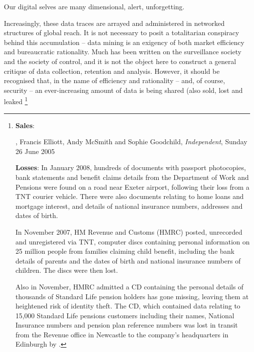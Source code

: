 {{

} Our digital
selves are many dimensional, alert, unforgetting.

Increasingly, these data traces are arrayed and administered in
networked structures of global reach. It is not necessary to posit a
totalitarian conspiracy behind this accumulation {--} data mining is an
exigency of both market efficiency and bureaucratic rationality. Much
has been written on the surveillance society and the society of
control, and it is not the object here to construct a general critique
of data collection, retention and analysis. However, it should be
recognised that, in the name of efficiency and rationality {--} and, of
course, security {--} an ever{}-increasing amount of data is being
shared (also sold, lost and leaked \footnote{{\bf Sales}: 

, Francis Elliott, Andy McSmith and Sophie Goodchild, {\em Independent}, Sunday 26 June 2005


{\bf Losses}: In January 2008, hundreds of documents with passport photocopies, bank
statements and benefit claims details from the Department of Work and
Pensions were found on a road near Exeter airport, following their loss
from a TNT courier vehicle. There were also documents relating to home
loans and mortgage interest, and details of national insurance numbers,
addresses and dates of birth.

In November 2007, HM Revenue and Customs (HMRC) posted, unrecorded and
unregistered via TNT, computer discs containing personal information on
25 million people from families claiming child benefit, including the
bank details of parents and the dates of birth and national insurance
numbers of children. The discs were then lost.

Also in November, HMRC admitted a CD containing the personal details of
thousands of Standard Life pension holders has gone missing, leaving
them at heightened risk of identity theft. The CD, which contained data
relating to 15,000 Standard Life pensions customers including their
names, National Insurance numbers and pension plan reference numbers
was lost in transit from the Revenue office in Newcastle to the
company's headquarters in Edinburgh by .

}}
